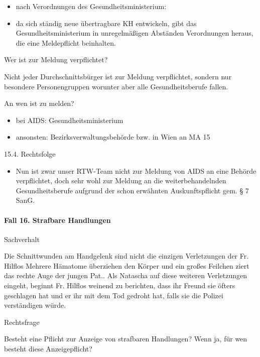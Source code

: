 \documentclass{article}
\begin{document}
\begin{itemize}
\item nach Verordnungen des Gesundheitsministerium:

\end{itemize}
\begin{itemize}
\item da sich st\"andig neue \"ubertragbare KH entwickeln, gibt das
Gesundheitsministerium in unregelm\"a{\ss}igen Abst\"anden Verordnungen
heraus, die eine Meldepflicht beinhalten.

\end{itemize}
Wer ist zur Meldung verpflichtet?

Nicht jeder Durchschnittsb\"urger ist zur Meldung verpflichtet, sondern
nur besondere Personengruppen worunter aber alle Gesundheitsberufe
fallen.

An wen ist zu melden?

\begin{itemize}
\item bei AIDS: Gesundheitsministerium

\item ansonsten: Bezirksverwaltungsbeh\"orde bzw. in Wien an MA 15

\end{itemize}
15.4. Rechtsfolge

\begin{itemize}
\item Nun ist zwar unser RTW-Team nicht zur Meldung von AIDS an eine
Beh\"orde verpflichtet, doch sehr wohl zur Meldung an die
weiterbehandelnden Gesundheitsberufe aufgrund der schon erw\"ahnten
Auskunftspflicht gem. {\S} 7 SanG.

\end{itemize}
\paragraph{Fall 16. Strafbare Handlungen}
Sachverhalt

Die Schnittwunden am Handgelenk sind nicht die einzigen Verletzungen der
Fr. Hilflos Mehrere H\"amatome \"uberziehen den K\"orper und ein
gro{\ss}es Feilchen ziert das rechte Auge der jungen Pat.. Als Natascha
auf diese weiteren Verletzungen eingeht, beginnt Fr. Hilflos weinend zu
berichten, dass ihr Freund sie \"ofters geschlagen hat und er ihr mit
dem Tod gedroht hat, falls sie die Polizei verst\"andigen w\"urde.

Rechtsfrage

Besteht eine Pflicht zur Anzeige von strafbaren Handlungen? Wenn ja,
f\"ur wen besteht diese Anzeigepflicht?
\end{document}
